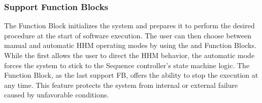 \begin{bibunit}
\subsubsection{Support Function Blocks}
The  Function Block initializes the system and prepares it to perform the desired procedure at the start of software execution.
The user can then choose between manual and automatic HHM operating modes by using the  and  Function Blocks.
While the first allows the user to direct the HHM behavior, the automatic mode forces the system to stick to the Sequence controller's state machine logic.
The  Function Block, as the last support FB, offers the ability to stop the execution at any time. This feature protects the system from internal or external failure caused by unfavorable conditions.


\end{bibunit}
